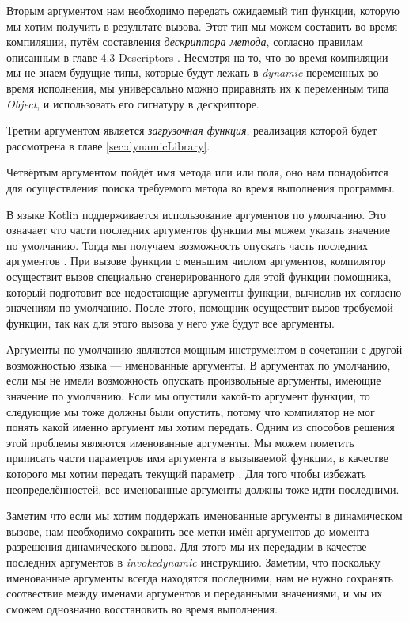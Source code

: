 Вторым аргументом нам необходимо передать ожидаемый тип функции, которую мы хотим получить в результате вызова. Этот тип мы можем составить во время компиляции, путём составления \textit{дескриптора метода}, согласно правилам описанным в главе 4.3 Descriptors \cite{book:yellin1996java}. Несмотря на то, что во время компиляции мы не знаем будущие типы, которые будут лежать в \textit{dynamic}-переменных во время исполнения, мы универсально можно приравнять их к переменным типа \textit{Object}, и использовать его сигнатуру в дескрипторе.

Третим аргументом является \textit{загрузочная функция}, реализация которой будет рассмотрена в главе \ref{sec:dynamicLibrary}.

Четвёртым аргументом пойдёт имя метода или или поля, оно нам понадобится для осуществления поиска требуемого метода во время выполнения программы.

В языке Kotlin поддерживается использование аргументов по умолчанию. Это означает что части последних аргументов функции мы можем указать значение по умолчанию. Тогда мы получаем возможность опускать часть последних аргументов \cite{book:jemerov2017kotlininAction}. При вызове функции с меньшим числом аргументов, компилятор осуществит вызов специально сгенерированного для этой функции помощника, который подготовит все недостающие аргументы функции, вычислив их согласно значениям по умолчанию. После этого, помощник осуществит вызов требуемой функции, так как для этого вызова у него уже будут все аргументы.

Аргументы по умолчанию являются мощным инструментом в сочетании с другой возможностью языка --- именованные аргументы. В аргументах по умолчанию, если мы не имели возможность опускать произвольные аргументы, имеющие значение по умолчанию. Если мы опустили какой-то аргумент функции, то следующие мы тоже должны были опустить, потому что компилятор не мог понять какой именно аргумент мы хотим передать. Одним из способов решения этой проблемы являются именованные аргументы. Мы можем пометить приписать части параметров имя аргумента в вызываемой функции, в качестве которого мы хотим передать текущий параметр \cite{book:jemerov2017kotlininAction}. Для того чтобы избежать неопределённостей, все именованные аргументы должны тоже идти последними.

Заметим что если мы хотим поддержать именованные аргументы в динамическом вызове, нам необходимо сохранить все метки имён аргументов до момента разрешения динамического вызова. Для этого мы их передадим в качестве последних аргументов в \textit{invokedynamic} инструкцию. Заметим, что поскольку именованные аргументы всегда находятся последними, нам не нужно сохранять соотвествие между именами аргументов и переданными значениями, и мы их сможем однозначно восстановить во время выполнения.


